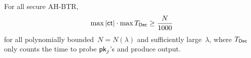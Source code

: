 \begin{corollary}\label{cor:lower-bound}
For all secure AH-BTR,
\begin{align*}
\max{|\ct|}\cdot\max{\TDec}\geq\frac{N}{1000}
\end{align*}
for all polynomially bounded~${N=N(\lambda)}$ and sufficiently large~$\lambda$,
where $\TDec$ only counts the time to probe $\pk_j$'s and produce output.
\end{corollary}
